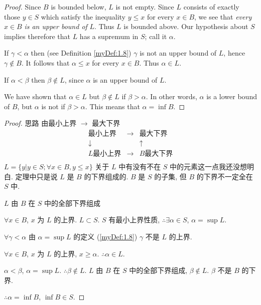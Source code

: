 \begin{proof}
    Since $B$ is bounded below, $L$ is not empty. 
    Since $L$ consists of exactly those $y \in S$ 
    which satisfy the inequality $y \leq x$ for every $x \in B$, 
    we see that \emph{every} $x \in B$ \emph{is an upper bound of} $L$. 
    Thus $L$ is bounded above.
    Our hypothesis about $S$ implies therefore that 
    $L$ has a supremum in $S$; 
    call it $\alpha$.

    If $\gamma < \alpha$ then (see Definition \ref{myDef:1.8}) 
    $\gamma$ is not an upper bound of $L$, 
    hence $\gamma \not\in B$. 
    It follows that $\alpha \leq x$ for every $x \in B$. 
    Thus $\alpha \in L$.

    If $\alpha < \beta$ then $\beta \not\in L$, 
    since $\alpha$ is an upper bound of $L$.

    We have shown that $\alpha \in L$ 
    but $\beta \not\in  L$ if $\beta > \alpha$. 
    In other words, $\alpha$ is a lower bound of $B$, 
    but $\alpha$ is not if $\beta > \alpha$. 
    This means that $\alpha = \inf B$.
\end{proof}


\begin{proof}
    思路 由最小上界 $\rightarrow $ 最大下界
    \begin{equation*}
        \begin{array}{ccc}
            \text{最小上界}  & \rightarrow  &\text{最大下界} \\
            \downarrow      &               &\uparrow \\
            L\text{最小上界}  & \rightarrow  &B\text{最大下界} \\
        \end{array}
    \end{equation*}
    $L = \{y| y\in S; \forall x\in B, y\leq x\}$
    关于 $L$ 中有没有不在 $S$ 中的元素这一点我还没想明白.
    定理中只是说 $L$ 是 $B$ 的下界组成的. 
    $B$ 是 $S$ 的子集, 但 $B$ 的下界不一定全在 $S$ 中. 

    $L$ 由 $B$ 在 $S$ 中的全部下界组成

    $\forall x\in B$, $x$ 为 $L$ 的上界. $L\subset S$.
    $S$ 有最小上界性质,
    $\therefore \exists \alpha\in S$, $\alpha = \sup L$.

    $\forall \gamma <\alpha$ 由 $\alpha = \sup L$ 的定义 (\ref{myDef:1.8})
    $\gamma$ 不是 $L$ 的上界.

    $\forall x \in B$, $x$ 为 $L$ 的上界, $x \geq \alpha$. $\therefore \alpha \in L$.

    $\alpha < \beta$, $\alpha = \sup L$. $\therefore \beta \not\in L$.
    $L$ 由 $B$ 在 $S$ 中的全部下界组成, $\beta \not\in L$.
    $\beta$ 不是 $B$ 的下界.

    $\therefore \alpha = \inf B$, $\inf B\in S$.
\end{proof}

